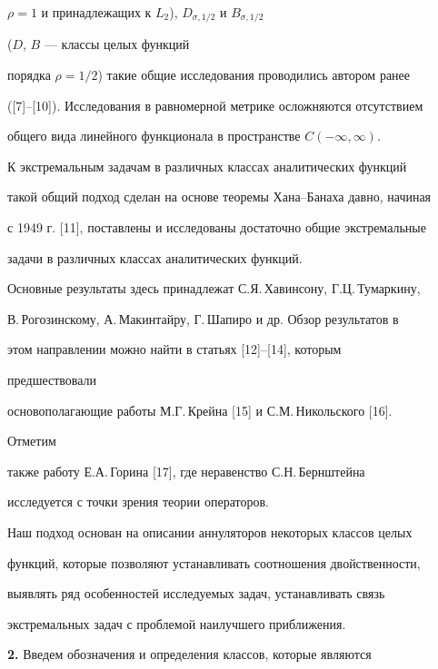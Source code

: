 $\rho=1$ и принадлежащих к $L_2$), $D_{\sigma,1/2}$ и $B_{\sigma,1/2}$ 


($D$, $B$ --- классы целых функций 


порядка $\rho=1/2$) такие общие исследования проводились автором ранее 


([7]--[10]). Исследования в равномерной метрике осложняются отсутствием 


общего вида линейного функционала в пространстве $C(-\infty,\infty)$. 


 


К экстремальным задачам в различных классах аналитических функций 


такой общий подход сделан на основе теоремы Хана--Банаха давно, начиная 


с 1949 г. [11], поставлены и исследованы достаточно общие экстремальные 


задачи в различных классах аналитических функций. 


 


Основные результаты здесь принадлежат С.Я.\,Хавинсону, Г.Ц.\,Тумаркину, 


В.\,Рогозинскому, А.\,Макинтайру, Г.\,Шапиро и др. Обзор результатов в 


этом направлении можно найти в статьях [12]--[14], которым 


предшествовали 


основополагающие работы М.Г.\,Крейна [15] и С.М.\,Ни\-коль\-с\-ко\-го [16]. 


Отметим 


также работу Е.А.\,Горина [17], где неравенство С.Н.\,Бернштейна 


исследуется с точки зрения теории операторов. 


 


Наш подход основан на описании аннуляторов некоторых классов целых 


функций, которые позволяют устанавливать соотношения двойственности, 


выявлять ряд особенностей исследуемых задач, устанавливать связь 


экстремальных задач с проблемой наилучшего приближения. 


\medskip 


 


{\bf 2.} Введем обозначения и определения классов, которые являются 



